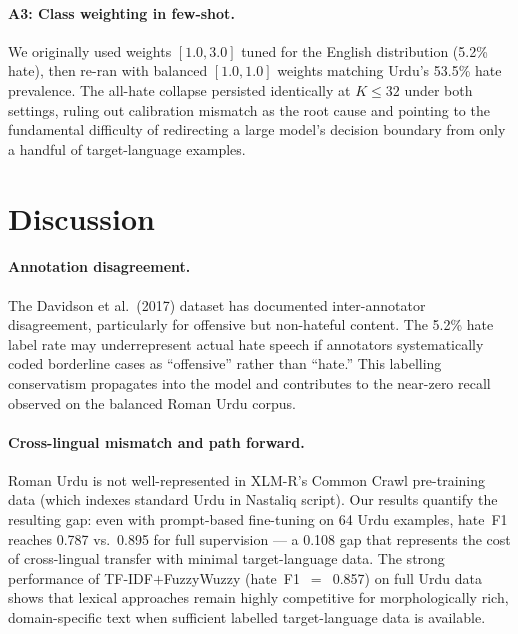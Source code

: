 \documentclass{article}
\begin{document}
\paragraph{A3: Class weighting in few-shot.}
We originally used weights $[1.0, 3.0]$ tuned for the English distribution (5.2\%
hate), then re-ran with balanced $[1.0, 1.0]$ weights matching Urdu's 53.5\%
hate prevalence.
The all-hate collapse persisted identically at $K \le 32$ under both settings,
ruling out calibration mismatch as the root cause and pointing to the fundamental
difficulty of redirecting a large model's decision boundary from only a handful
of target-language examples.

\section{Discussion}
\label{sec:discussion}

\paragraph{Annotation disagreement.}
The Davidson et al.\ (2017) dataset has documented inter-annotator disagreement,
particularly for offensive but non-hateful content.
The 5.2\% hate label rate may underrepresent actual hate speech if annotators
systematically coded borderline cases as ``offensive'' rather than ``hate.''
This labelling conservatism propagates into the model and contributes to the
near-zero recall observed on the balanced Roman Urdu corpus.

\paragraph{Cross-lingual mismatch and path forward.}
Roman Urdu is not well-represented in XLM-R's Common Crawl pre-training data
(which indexes standard Urdu in Nastaliq script).
Our results quantify the resulting gap: even with prompt-based fine-tuning on
64 Urdu examples, hate~F1 reaches 0.787 vs.\ 0.895 for full supervision ---
a 0.108 gap that represents the cost of cross-lingual transfer with minimal
target-language data.
The strong performance of TF-IDF$+$FuzzyWuzzy (hate~F1~$=$~0.857) on full Urdu
data shows that lexical approaches remain highly competitive for morphologically
rich, domain-specific text when sufficient labelled target-language data is
available.

\end{document}
